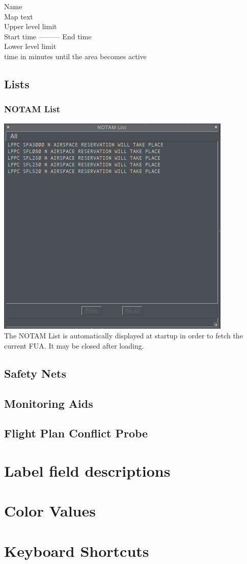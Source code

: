 \documentclass[11pt,a4paper,oldfontcommands]{memoir}
\begin{document}
\begin{center}
        Name\\ 
        Map text\\
        Upper level limit\\
        Start time --------- End time\\
        Lower level limit\\time in minutes until the area becomes active
\end{center}

\section{Lists}

\subsection{NOTAM List}
\label{list:notam}
\includegraphics{img/notamlist.png}\\
The NOTAM List is automatically displayed at startup in order to fetch the current FUA. It may be closed after loading.\\

\section{Safety Nets}

\section{Monitoring Aids}

\section{Flight Plan Conflict Probe}

\appendix

\chapter{Label field descriptions}

\chapter{Color Values}

\chapter{Keyboard Shortcuts}



\end{document}
